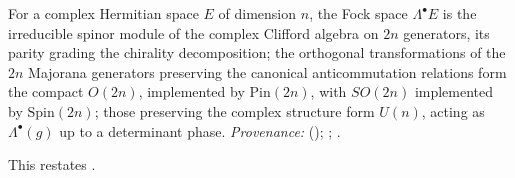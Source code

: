 For a complex Hermitian space $E$ of dimension $n$, the Fock space $\Lambda^{\bullet}E$ is the irreducible spinor module of the complex Clifford algebra on $2n$ generators, its parity grading the chirality decomposition; the orthogonal transformations of the $2n$ Majorana generators preserving the canonical anticommutation relations form the compact $O(2n)$, implemented by $\mathrm{Pin}(2n)$, with $SO(2n)$ implemented by $\mathrm{Spin}(2n)$; those preserving the complex structure form $U(n)$, acting as $\Lambda^{\bullet}(g)$ up to a determinant phase. \emph{Provenance:} \cite[Fact~2.11]{ButlerT12} (); \cite[Lecture~20]{FultonHarris1991}; \cite[Ch.~I, \S\S 2, 5]{LawsonMichelsohn1989}.

This restates .
